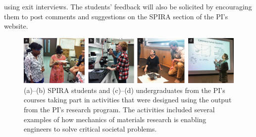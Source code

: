 \documentclass[10pt,letterpaper]{article}
\begin{document}
using exit interviews. The students' feedback will also be solicited by encouraging them to post comments and suggestions on the SPIRA section of the PI's website.

    \begin{figure}[h]
      \centering
      \includegraphics[width=\textwidth]{./Figures/SPIRA/OutreachFigure.png}
      \vspace{-10pt}
      \caption{\footnotesize (a)--(b) SPIRA students and (c)--(d) undergraduates from the PI's courses taking part in activities that were designed using the output from the PI's research program. The activities included several examples of how mechanics of materials research is enabling engineers to solve critical societal problems.}
      \label{f:outreach}
    \end{figure}

\end{document}
